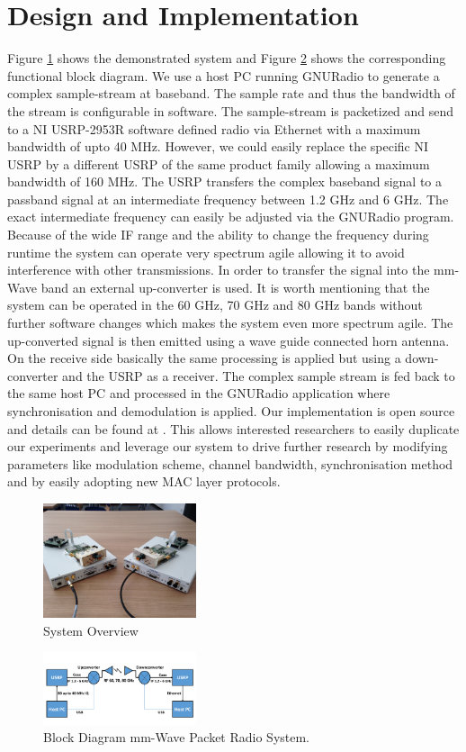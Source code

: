 \documentclass{acm_proc_article-sp}
\begin{document}
\section{Design and Implementation}
Figure \ref{fig:system} shows the demonstrated system and Figure \ref{fig:block} shows the corresponding functional block diagram. 
We use a host PC running GNURadio \cite{gnuradio} to generate a complex sample-stream at baseband. The sample rate and thus the bandwidth of the stream is configurable in software. The sample-stream is packetized and send to a NI USRP-2953R \cite{ettus} software defined radio via Ethernet with a maximum bandwidth of upto 40 MHz. However, we could easily replace the specific NI USRP by a different USRP of the same product family allowing a maximum bandwidth of 160 MHz.
The USRP transfers the complex baseband signal to a passband signal at an intermediate frequency between 1.2 GHz and 6 GHz. The exact intermediate frequency can easily be adjusted via the GNURadio program. Because of the wide IF range and the ability to change the frequency during runtime the system can operate very spectrum agile allowing it to avoid interference with other transmissions.
In order to transfer the signal into the mm-Wave band an external up-converter is used. It is worth mentioning that the system can be operated in the 60 GHz, 70 GHz and 80 GHz bands without further software changes which makes the system even more spectrum agile.
The up-converted signal is then emitted using a wave guide connected horn antenna.
On the receive side basically the same processing is applied but using a down-converter and the USRP as a receiver. The complex sample stream is fed back to the same host PC and processed in the GNURadio application where synchronisation and demodulation is applied.
Our implementation is open source and details can be found at \cite{gr-inets}. This allows interested researchers to easily duplicate our experiments and leverage our system to drive further research by modifying parameters like modulation scheme, channel bandwidth, synchronisation method and by easily adopting new MAC layer protocols.
\begin{figure}[!t]
\center
\includegraphics[width=0.4\textwidth]{system}
\caption{System Overview}
\label{fig:system}
\end{figure}
\begin{figure}[!t]
\center
\includegraphics[width=0.4\textwidth]{block-diagram}
\caption{Block Diagram mm-Wave Packet Radio System.}
\label{fig:block}
\end{figure}
\end{document}
